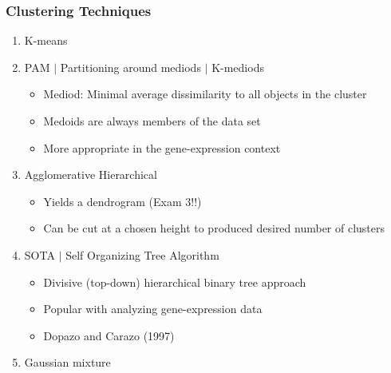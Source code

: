 \documentclass[10pt,dvipsnames,table, handout]{beamer} %
\begin{document}
\begin{frame}
\frametitle{Clustering Techniques}
\begin{enumerate}
\pause \item K-means
\pause \item PAM $|$ Partitioning around mediods $|$ K-mediods
\begin{itemize}
\item Mediod: Minimal average dissimilarity to all objects in the cluster
\item Medoids are always members of the data set
\item More appropriate in the gene-expression context
\end{itemize}
\pause \item Agglomerative Hierarchical
\begin{itemize}
\item Yields a dendrogram (Exam 3!!)
\item Can be cut at a chosen height to produced desired number of clusters
\end{itemize}
\pause \item SOTA $|$ Self Organizing Tree Algorithm
\begin{itemize}
\item Divisive (top-down) hierarchical binary tree approach
\item Popular with analyzing gene-expression data
\item Dopazo and Carazo (1997)
\end{itemize}
\pause \item Gaussian mixture
\end{enumerate}
\end{frame}
\end{document}
